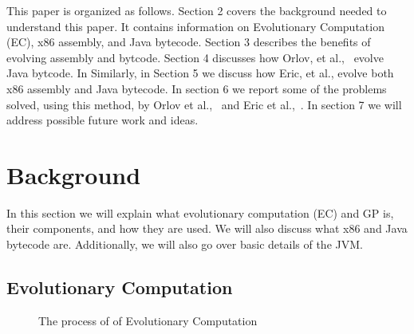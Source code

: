 \documentclass{sig-alternate}
\begin{document}
This paper is organized as follows. Section 2 covers the background needed to understand this paper. It contains information on Evolutionary Computation (EC), x86 assembly, and Java bytecode. Section 3 describes the benefits of evolving assembly and bytcode. Section 4 discusses how Orlov, et al.,~\cite{FINCH:2011} evolve Java bytcode. In Similarly, in Section 5 we discuss how Eric, et al., evolve both x86 assembly and Java bytecode. In section 6 we report some of the problems solved, using this method, by Orlov et al.,~\cite{FINCH:2011} and Eric et al.,~\cite{Assembly:2010}. In section 7 we will address possible future work and ideas.
	
	

\section{Background}


In this section we will explain what evolutionary computation (EC) and GP is, their components, and how they are used.
We will also discuss what x86 and Java bytecode are. Additionally, we will also go over basic details of the JVM.
\subsection{Evolutionary Computation}
\begin{figure}
\centering
{}

\caption{The process of of Evolutionary Computation}
\label{ECdiagram}
\end{figure}
\end{document}
